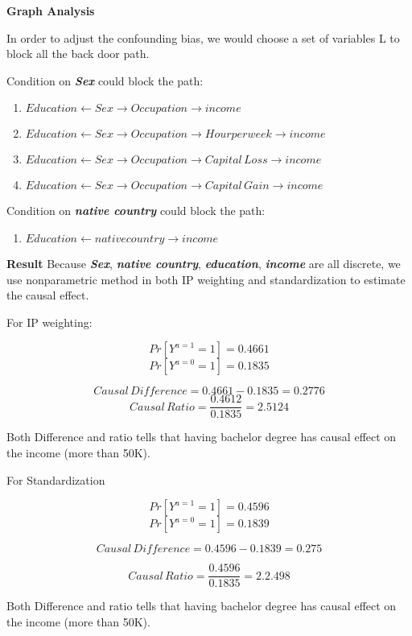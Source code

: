 \documentclass[letterpaper,12pt]{article}
\begin{document}
\textbf{Graph Analysis} \par
In order to adjust the confounding bias, we would choose a set of variables L to block all the back door path. \par

Condition on \textbf{\textit{Sex}} could block the path:
\begin{enumerate}
\item $Education \leftarrow Sex \rightarrow Occupation \rightarrow income $
\item $Education \leftarrow  Sex \rightarrow Occupation \rightarrow Hour per week \rightarrow income $ 
\item $Education \leftarrow  Sex \rightarrow Occupation \rightarrow Capital\, Loss \rightarrow income$
\item $Education \leftarrow  Sex \rightarrow Occupation \rightarrow Capital\, Gain \rightarrow income$
\end{enumerate}
Condition on \textbf{\textit{native country}} could block the path:
\begin{enumerate}
\item $Education \leftarrow native country \rightarrow income$ \par
\end{enumerate}

\textbf{Result}
Because \textbf{\textit{Sex}}, \textbf{\textit{native country}}, \textbf{\textit{education}}, \textbf{\textit{income}} are all discrete, we use nonparametric method in both IP weighting and standardization to estimate the causal effect.

For IP weighting:

$$
Pr[Y^{a=1}=1]=0.4661
$$
$$
Pr[Y^{a=0}=1]=0.1835
$$

$$Causal\,Difference = 0.4661-0.1835=0.2776$$
$$Causal\,Ratio= \frac{0.4612}{0.1835}=2.5124$$
\par
Both Difference and ratio tells that having bachelor degree has causal effect on  the income (more than 50K). \par


For  Standardization


$$Pr[Y^{a=1}=1]=0.4596$$
$$Pr[Y^{a=0}=1]=0.1839$$

$$Causal\,Difference = 0.4596-0.1839=0.275$$

$$Causal\, Ratio= \frac{0.4596}{0.1835}=2. 2.498$$ 

Both Difference and ratio tells that having bachelor degree has causal effect on  the income (more than 50K).
\end{document}

